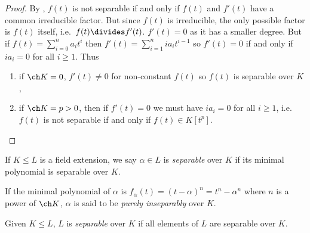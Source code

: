 \documentclass[a4paper]{article}
\begin{document}
\begin{proof}
  By , \(f(t)\) is not separable if and only if \(f(t)\) and \(f'(t)\) have a common irreducible factor. But since \(f(t)\) is irreducible, the only possible factor is \(f(t)\) itself, i.e.\ \(f(t) \divides f'(t)\). \(f'(t) = 0\) as it has a smaller degree. But if \(f(t) = \sum_{i = 0}^{n} a_it^i\) then \(f'(t) = \sum_{i = 1}^{n} ia_it^{i - 1}\) so \(f'(t) = 0\) if and only if \(ia_i = 0\) for all \(i \geq 1\). Thus
  \begin{enumerate}
  \item if \(\ch K = 0\), \(f'(t) \neq 0\) for non-constant \(f(t)\) so \(f(t)\) is separable over \(K\),
  \item if \(\ch K = p > 0\), then if \(f'(t) = 0\) we must have \(ia_i = 0\) for all \(i \geq 1\), i.e.\ \(f(t)\) is not separable if and only if \(f(t) \in K[t^p]\).
  \end{enumerate}
\end{proof}

\begin{definition}
  If \(K \leq L\) is a field extension, we say \(\alpha \in L\) is \emph{separable} over \(K\) if its minimal polynomial is separable over \(K\).
\end{definition}

\begin{definition}
  If the minimal polynomial of \(\alpha\) is \(f_\alpha(t) = (t - \alpha)^n = t^n - \alpha^n\) where \(n\) is a power of \(\ch K\), \(\alpha\) is said to be \emph{purely inseparably} over \(K\).
\end{definition}

\begin{definition}
  Given \(K \leq L\), \(L\) is \emph{separable} over \(K\) if all elements of \(L\) are separable over \(K\).
\end{definition}
\end{document}
